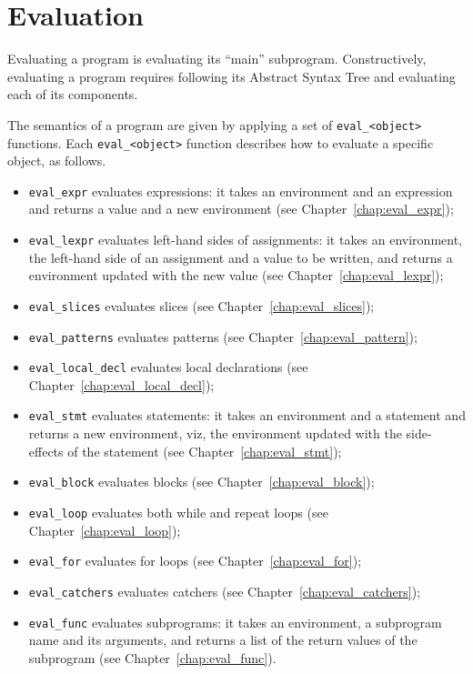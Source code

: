 \documentclass{book}
\begin{document}
\section{Evaluation}

Evaluating a program is evaluating its ``main'' subprogram.
Constructively, evaluating a program requires following its
Abstract Syntax Tree and evaluating each of its components.

The semantics of a program are given by applying a set of
\texttt{eval\_<object>} functions. Each \texttt{eval\_<object>} function
describes how to evaluate a specific object, as follows.
\begin{itemize}
\item \texttt{eval\_expr} evaluates expressions: it takes an
environment and an expression and returns a value and a
new environment (see Chapter~\ref{chap:eval_expr});
\item \texttt{eval\_lexpr} evaluates left-hand sides of assignments: it takes
an environment, the left-hand side of an assignment and a value to be written,
and returns a environment updated with the new value (see
Chapter~\ref{chap:eval_lexpr});
\item \texttt{eval\_slices} evaluates slices (see Chapter~\ref{chap:eval_slices});
\item \texttt{eval\_patterns} evaluates patterns (see Chapter~\ref{chap:eval_pattern});
\item \texttt{eval\_local\_decl} evaluates local declarations (see Chapter~\ref{chap:eval_local_decl});
\item \texttt{eval\_stmt} evaluates statements: it takes an
environment and a statement and returns a new
environment, viz, the environment updated with the side-effects
of the statement (see Chapter~\ref{chap:eval_stmt});
\item \texttt{eval\_block} evaluates blocks (see Chapter~\ref{chap:eval_block});
\item \texttt{eval\_loop} evaluates both while and repeat loops (see Chapter~\ref{chap:eval_loop});
\item \texttt{eval\_for} evaluates for loops (see Chapter~\ref{chap:eval_for});
\item \texttt{eval\_catchers} evaluates catchers (see Chapter~\ref{chap:eval_catchers});
\item \texttt{eval\_func} evaluates subprograms: it takes an
environment, a subprogram name and its arguments, and returns a
list of the return values of the subprogram (see Chapter~\ref{chap:eval_func}). 
\end{itemize}
\end{document}
